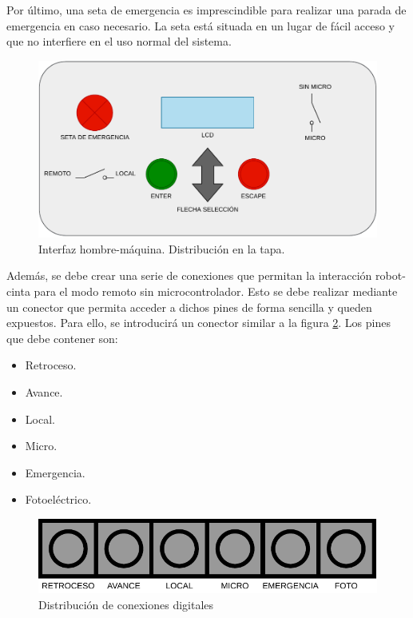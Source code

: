 Por último, una seta de emergencia es imprescindible para realizar una parada de emergencia en caso necesario. La seta está situada en un lugar de fácil acceso y que no interfiere en el uso normal del sistema.


\begin{figure}[htbp]
	\centering
	\includegraphics[width=\textwidth]{01-introduccion/HMI.pdf}
	\caption{Interfaz hombre-máquina. Distribución en la tapa.}
	\label{fig:interfazhmi}
	\end{figure}

Además, se debe crear una serie de conexiones que permitan la interacción robot-cinta para el modo remoto sin microcontrolador. Esto se debe realizar mediante un conector que permita acceder a dichos pines de forma sencilla y queden expuestos. Para ello, se introducirá un conector similar a la figura \ref{fig:digitales}. Los pines que debe contener son:
\begin{itemize}
	\item Retroceso.
 	\item Avance.
	\item Local.
	\item Micro.
	\item Emergencia.
  	\item Fotoeléctrico.	
\end{itemize}

\begin{figure}[htbp]
	\centering
	\includegraphics[scale=0.75]{01-introduccion/DIGITALES.pdf}
	\caption{Distribución de conexiones digitales}
	\label{fig:digitales}
	\end{figure}